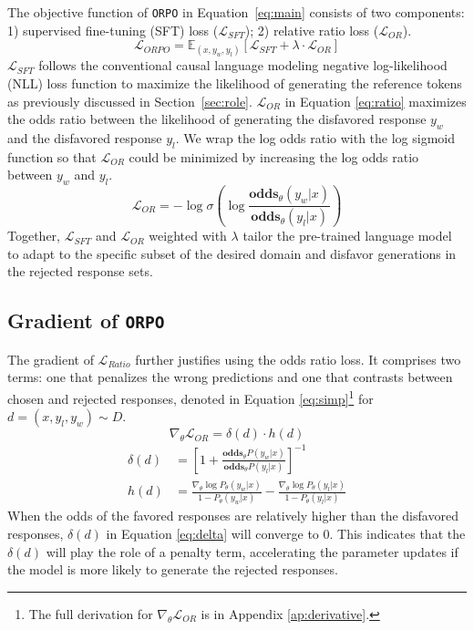 The objective function of \texttt{ORPO} in Equation~\ref{eq:main} consists of two components: 1) supervised fine-tuning (SFT) loss ($\mathcal{L}_{SFT}$); 2) relative ratio loss ($\mathcal{L}_{OR}$).
\begin{equation}
    \mathcal{L}_{ORPO} = \mathbb{E}_{(x, y_w, y_l)}\left[ \mathcal{L}_{SFT} + \lambda \cdot \mathcal{L}_{OR} \right]
    \label{eq:main}
\end{equation}
$\mathcal{L}_{SFT}$ follows the conventional causal language modeling negative log-likelihood (NLL) loss function to maximize the likelihood of generating the reference tokens as previously discussed in Section~\ref{sec:role}.
$\mathcal{L}_{OR}$ in Equation \ref{eq:ratio} maximizes the odds ratio between the likelihood of generating the disfavored response $y_w$ and the disfavored response $y_l$. We wrap the log odds ratio with the log sigmoid function so that $\mathcal{L}_{OR}$ could be minimized by increasing the log odds ratio between $y_w$ and $y_l$.
\begin{equation}
    \mathcal{L}_{OR} = -\log \sigma \left( \log \frac{\textbf{odds}_\theta(y_w|x)}{\textbf{odds}_\theta(y_l|x)} \right) \label{eq:ratio} 
\end{equation}
Together, $\mathcal{L}_{SFT}$ and $\mathcal{L}_{OR}$ weighted with $\lambda$ tailor the pre-trained language model to adapt to the specific subset of the desired domain and disfavor generations in the rejected response sets.

\subsection{Gradient of \texttt{ORPO}}\label{subsec:grad}

The gradient of $\mathcal{L}_{Ratio}$ further justifies using the odds ratio loss. It comprises two terms: one that penalizes the wrong predictions and one that contrasts between chosen and rejected responses, denoted in Equation \ref{eq:simp}\footnote{The full derivation for $\nabla_\theta \mathcal{L}_{OR}$ is in Appendix \ref{ap:derivative}.} for $d=(x, y_l, y_w)\sim D$.
\begin{equation}
    \nabla_\theta \mathcal{L}_{OR} = \delta(d) \cdot h(d)\label{eq:simp}
\end{equation}
\begin{align}
    \delta(d) &= \left[ 1 + \frac{\textbf{odds}_\theta P(y_w|x)}{\textbf{odds}_\theta P(y_l|x)} \right]^{-1}\label{eq:delta} \\
    h(d) &= \frac{\nabla_\theta \log P_\theta(y_w|x)}{1 - P_\theta(y_w|x)} - \frac{\nabla_\theta \log P_\theta(y_l|x)}{1 - P_\theta(y_l|x)}\label{eq:grad}
\end{align}
When the odds of the favored responses are relatively higher than the disfavored responses, $\delta(d)$ in Equation \ref{eq:delta} will converge to 0. This indicates that the $\delta(d)$ will play the role of a penalty term, accelerating the parameter updates if the model is more likely to generate the rejected responses. 

